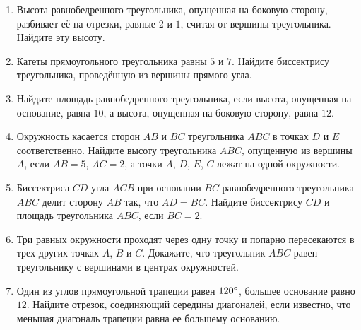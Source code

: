 \documentclass[12pt, a4paper]{article}
\begin{document}
	   \cfoot{}
	\begin{enumerate}[label=\textbf{\arabic*.}]
		\item Высота равнобедренного треугольника, опущенная на боковую сторону, разбивает её на отрезки, равные \( 2 \) и \( 1 \), считая от вершины треугольника. Найдите эту высоту.
		
		\item Катеты прямоугольного треугольника равны \( 5 \) и \( 7 \). Найдите биссектрису треугольника, проведённую из вершины прямого угла.
		
		\item Найдите площадь равнобедренного треугольника, если высота, опущенная на основание, равна \( 10 \), а высота, опущенная на боковую сторону, равна \( 12 \).
		
		\item Окружность касается сторон \( AB \) и \( BC \) треугольника \( ABC \)
		в точках \( D \) и \( E \) соответственно. Найдите высоту треугольника \( ABC \),
		опущенную из вершины \( A \), если \( AB = 5 \), \( AC = 2 \), а точки \( A \), \( D \), \( E \), \( C \) лежат на одной окружности.
		
		\item Биссектриса \( CD \) угла \( ACB \) при основании \( BC \) равнобедренного треугольника \( ABC \) делит сторону \( AB \) так, что \( AD = BC \). Найдите биссектрису \( CD \) и площадь треугольника \( ABC \), если \( BC = 2 \).
		
		\item Три равных окружности проходят через одну точку и попарно пересекаются в трех других точках \( A \), \( B \) и \( C \). Докажите, что треугольник \( ABC \) равен треугольнику с вершинами в центрах окружностей.
		
		\item Один из углов прямоугольной трапеции равен \( 120\degree \), большее основание равно \( 12 \). Найдите отрезок, соединяющий середины диагоналей, если известно, что меньшая диагональ трапеции равна ее большему основанию.
		
	\end{enumerate}
\end{document}
